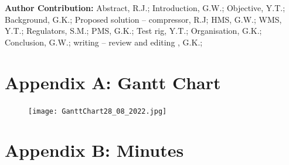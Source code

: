 \documentclass[a4paper,11pt]{article}
\begin{document}
\textbf{Author Contribution: }Abstract, R.J.; Introduction, G.W.; Objective, Y.T.; Background, G.K.; Proposed solution – compressor, R.J; HMS, G.W.; WMS, Y.T.; Regulators, S.M.; PMS, G.K.; Test rig, Y.T.; Organisation, G.K.; Conclusion, G.W.; writing – review and editing , G.K.; 

\newpage







\newpage
\appendix
\appendixpage
\section{Appendix A: Gantt Chart}\label{section:gantt}

\begin{figure}[h]\label{fig:ganttChart} 
    \texttt{[image: GanttChart28\_08\_2022.jpg]}
    \centering
\end{figure}

\section{Appendix B: Minutes}\label{section:minutes}
\end{document}
